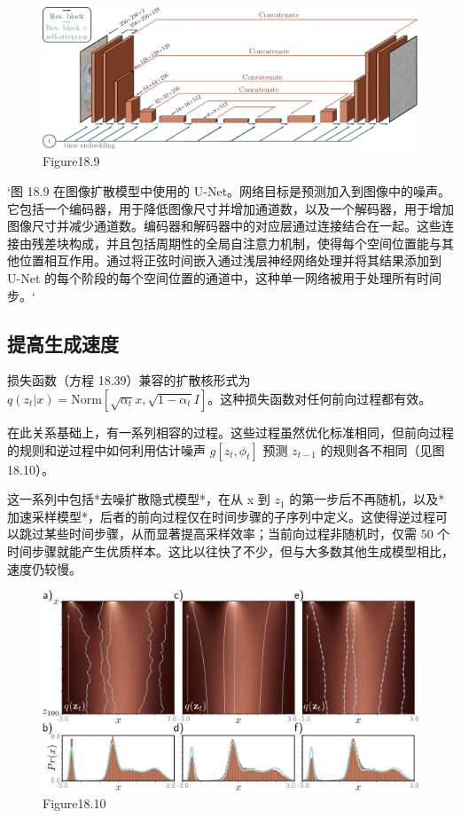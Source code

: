 \begin{figure}[ht!]
\centering
\includegraphics[width=0.7\linewidth]{png/chapter18/DiffusionUNet.png}
\caption{Figure18.9}
\end{figure}

`图 18.9 在图像扩散模型中使用的 U-Net。网络目标是预测加入到图像中的噪声。它包括一个编码器，用于降低图像尺寸并增加通道数，以及一个解码器，用于增加图像尺寸并减少通道数。编码器和解码器中的对应层通过连接结合在一起。这些连接由残差块构成，并且包括周期性的全局自注意力机制，使得每个空间位置能与其他位置相互作用。通过将正弦时间嵌入通过浅层神经网络处理并将其结果添加到 U-Net 的每个阶段的每个空间位置的通道中，这种单一网络被用于处理所有时间步。`

\subsection{提高生成速度}
损失函数（方程 18.39）兼容的扩散核形式为 \(q(z_t|x) = \text{Norm}[ \sqrt{\alpha_t}x, \sqrt{1 - \alpha_t} I ]\)。这种损失函数对任何前向过程都有效。

在此关系基础上，有一系列相容的过程。这些过程虽然优化标准相同，但前向过程的规则和逆过程中如何利用估计噪声 \( g[z_t, \phi_t] \) 预测 \(z_{t-1}\) 的规则各不相同（见图 18.10）。

这一系列中包括*去噪扩散隐式模型*，在从 x 到 \(z_1\) 的第一步后不再随机，以及*加速采样模型*，后者的前向过程仅在时间步骤的子序列中定义。这使得逆过程可以跳过某些时间步骤，从而显著提高采样效率；当前向过程非随机时，仅需 50 个时间步骤就能产生优质样本。这比以往快了不少，但与大多数其他生成模型相比，速度仍较慢。

\begin{figure}[ht!]
\centering
\includegraphics[width=0.7\linewidth]{png/chapter18/DiffusionImplicit.png}
\caption{Figure18.10}
\end{figure}

